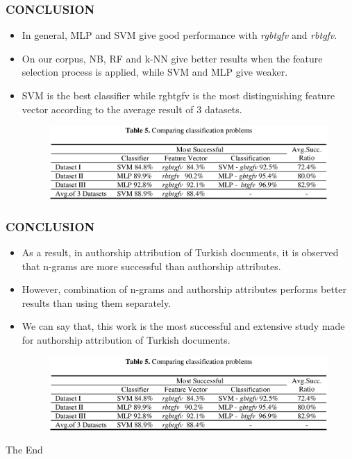 \documentclass{beamer}
\begin{document}
 
 \begin{frame}
  \frametitle{CONCLUSION}
  \begin{itemize}
   
   \item In general, MLP and SVM give good performance with \textit{rgbtgfv} and \textit{rbtgfv}.
   \item On our corpus, NB, RF and k-NN give better results when the feature selection process is applied, while SVM and MLP give weaker. 
   \item SVM is the best classifier while rgbtgfv is the most distinguishing feature vector according to the average result of 3 datasets.
   
   \begin{figure}[h]
    \begin{center}
      \includegraphics[scale=0.2]{table_5.png}
    \end{center}
   \end{figure}
   
  \end{itemize}
 \end{frame}
 
 
  \begin{frame}
  \frametitle{CONCLUSION}
  \begin{itemize}
    \item As a result, in authorship attribution of Turkish documents, it is observed that n-grams are more successful than authorship attributes. 
   \item However, combination of n-grams and authorship attributes performs better results than using them separately.
   \item We can say that, this work is the most successful and extensive study made for authorship attribution of Turkish documents.
   
   \begin{figure}[h]
    \begin{center}
      \includegraphics[scale=0.2]{table_5.png}
    \end{center}
   \end{figure}
      
  \end{itemize}
 \end{frame}

 
 \begin{frame}
 \begin{center}
 \begin{Huge}
 The End
 \end{Huge}
 \end{center}
 \end{frame}
 
  
\end{document}

